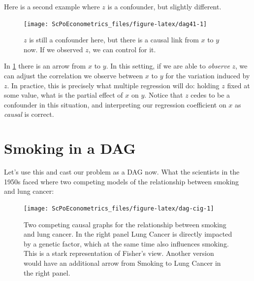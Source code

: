 \documentclass[]{book}
\begin{document}
Here is a second example where \(z\) is a confounder, but slightly different.

\begin{figure}

{\centering \texttt{[image: ScPoEconometrics\_files/figure-latex/dag41-1]} 

}

\caption{$z$ is still a confounder here, but there is a causal link from $x$ to $y$ now. If we observed $z$, we can control for it.}\label{fig:dag41}
\end{figure}

In \ref{fig:dag41} there is an arrow from \(x\) to \(y\). In this setting, if we are able to \emph{observe} \(z\), we can adjust the correlation we observe between \(x\) to \(y\) for the variation induced by \(z\). In practice, this is precisely what multiple regression will do: holding \(z\) fixed at some value, what is the partial effect of \(x\) on \(y\). Notice that \(z\) cedes to be a confounder in this situation, and interpreting our regression coefficient on \(x\) as \emph{causal} is correct.

\hypertarget{smoking-in-a-dag}{%
\section{Smoking in a DAG}\label{smoking-in-a-dag}}

Let's use this and cast our problem as a DAG now. What the scientists in the 1950s faced where two competing models of the relationship between smoking and lung cancer:

\begin{figure}

{\centering \texttt{[image: ScPoEconometrics\_files/figure-latex/dag-cig-1]} 

}

\caption{Two competing causal graphs for the relationship between smoking and lung cancer. In the right panel Lung Cancer is directly impacted by a genetic factor, which at the same time also influences smoking. This is a stark representation of Fisher's view. Another version would have an additional arrow from Smoking to Lung Cancer in the right panel.}\label{fig:dag-cig}
\end{figure}
\end{document}
